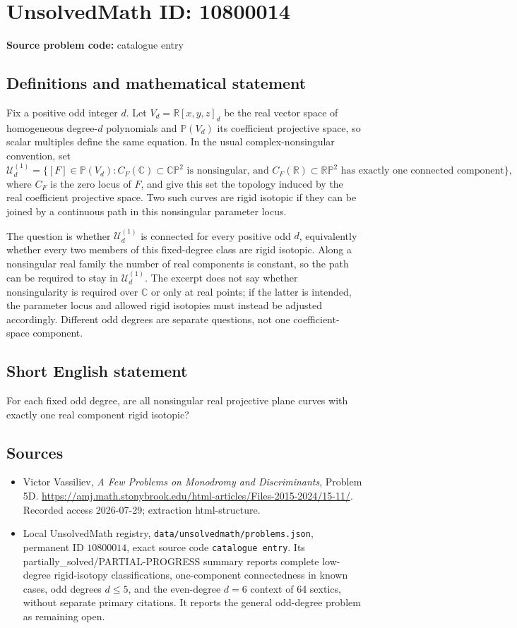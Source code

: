 \documentclass[11pt]{article}
\newcommand{\R}{\mathbb{R}}
\newcommand{\C}{\mathbb{C}}
\newcommand{\PP}{\mathbb{P}}
\begin{document}
\section*{UnsolvedMath ID: 10800014}
\textbf{Source problem code:} catalogue entry
\subsection{Definitions and mathematical statement}
Fix a positive odd integer \(d\). Let \(V_d=\R[x,y,z]_d\) be the real vector space of homogeneous degree-\(d\) polynomials and \(\PP(V_d)\) its coefficient projective space, so scalar multiples define the same equation. In the usual complex-nonsingular convention, set
\[
 \mathcal U_d^{(1)}=\bigl\{[F]\in\PP(V_d):
 C_F(\C)\subset\C\PP^2\text{ is nonsingular, and }
 C_F(\R)\subset\R\PP^2\text{ has exactly one connected component}\bigr\},
\]
where \(C_F\) is the zero locus of \(F\), and give this set the topology induced by the real coefficient projective space. Two such curves are rigid isotopic if they can be joined by a continuous path in this nonsingular parameter locus.

The question is whether \(\mathcal U_d^{(1)}\) is connected for every positive odd \(d\), equivalently whether every two members of this fixed-degree class are rigid isotopic. Along a nonsingular real family the number of real components is constant, so the path can be required to stay in \(\mathcal U_d^{(1)}\). The excerpt does not say whether nonsingularity is required over \(\C\) or only at real points; if the latter is intended, the parameter locus and allowed rigid isotopies must instead be adjusted accordingly. Different odd degrees are separate questions, not one coefficient-space component.
\subsection{Short English statement}
For each fixed odd degree, are all nonsingular real projective plane curves with exactly one real component rigid isotopic?
\subsection{Sources}
\begin{itemize}
\item Victor Vassiliev, \emph{A Few Problems on Monodromy and Discriminants}, Problem 5D. \url{https://amj.math.stonybrook.edu/html-articles/Files-2015-2024/15-11/}. Recorded access 2026-07-29; extraction html-structure.
\item Local UnsolvedMath registry, \texttt{data/unsolvedmath/problems.json}, permanent ID \(10800014\), exact source code \texttt{catalogue entry}. Its partially\_solved/PARTIAL-PROGRESS summary reports complete low-degree rigid-isotopy classifications, one-component connectedness in known cases, odd degrees \(d\leq5\), and the even-degree \(d=6\) context of 64 sextics, without separate primary citations. It reports the general odd-degree problem as remaining open.
\end{itemize}
\end{document}
